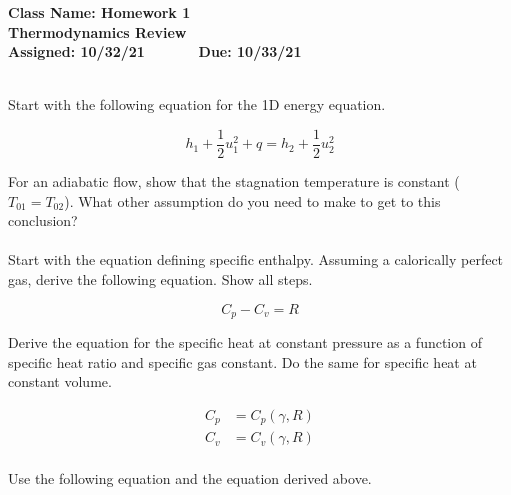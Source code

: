 \documentclass[letterpaper,12pt]{article}
\begin{document}
\begin{center}									%
\textbf{Class Name: Homework 1} \\				%
\textbf{Thermodynamics Review} 	\\				%
\textbf{Assigned: 10/32/21~~~~~~ Due: 10/33/21}	%
\end{center}


\noindent {} \\

\noindent Start with the following equation for the 1D energy equation.

\begin{equation}
	h_1 + \frac{1}{2} u_1^2 + q = h_2 + \frac{1}{2} u_2^2
\end{equation}

\noindent For an adiabatic flow, show that the stagnation temperature is constant ($T_{01} = T_{02}$).  What other assumption do you need to make to get to this conclusion? \\


\noindent {} \\

\noindent Start with the equation defining specific enthalpy.  Assuming a calorically perfect gas, derive the following equation.  Show all steps.

\begin{equation}
	C_p - C_v = R
\end{equation}

\noindent Derive the equation for the specific heat at constant pressure as a function of specific heat ratio and specific gas constant.  Do the same for specific heat at constant volume.

\begin{equation}
\begin{aligned}
	C_p &= C_p\left(\gamma,R\right) \\
	C_v &= C_v\left(\gamma,R\right) \\
\end{aligned}
\end{equation}

\noindent Use the following equation and the equation derived above.
\end{document}
